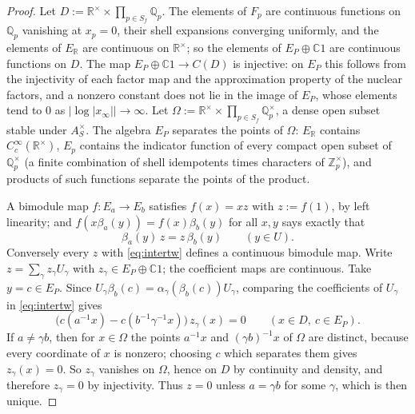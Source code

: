\documentclass[11pt]{amsart}
\theoremstyle{definition}
\theoremstyle{remark}
\newcommand{\C}{\mathbb C}
\newcommand{\R}{\mathbb R}
\newcommand{\Z}{\mathbb Z}
\newcommand{\Q}{\mathbb Q}
\begin{document}
\begin{proof}
Let $D:=\R^{\times}\times\prod_{p\in S_f}\Q_p$.  The elements of $F_p$ are
continuous functions on $\Q_p$ vanishing at $x_p=0$, their shell expansions
converging uniformly, and the elements of $E_{\R}$ are continuous on
$\R^{\times}$; so the elements of $E_P\oplus\C1$ are continuous functions on
$D$.  The map $E_P\oplus\C1\to C(D)$ is injective: on $E_P$ this follows from
the injectivity of each factor map and the approximation property of the
nuclear factors, and a nonzero constant does not lie in the image of $E_P$,
whose elements tend to $0$ as $|\log|x_{\infty}||\to\infty$.  Let
$\Omega:=\R^{\times}\times\prod_{p\in S_f}\Q_p^{\times}$, a dense open subset
stable under $A_S^{\times}$.  The algebra $E_P$ separates the points of
$\Omega$: $E_{\R}$ contains $C_c^{\infty}(\R^{\times})$, $E_p$ contains the
indicator function of every compact open subset of $\Q_p^{\times}$ (a finite
combination of shell idempotents times characters of $\Z_p^{\times}$), and
products of such functions separate the points of the product.

A bimodule map $f:E_a\to E_b$ satisfies $f(x)=xz$ with $z:=f(1)$, by left
linearity; and $f(x\beta_a(y))=f(x)\beta_b(y)$ for all $x,y$ says exactly
that
\begin{equation}\label{eq:intertw}
\beta_a(y)\,z=z\,\beta_b(y)\qquad(y\in U).
\end{equation}
Conversely every $z$ with \eqref{eq:intertw} defines a continuous bimodule
map.  Write $z=\sum_{\gamma}z_{\gamma}U_{\gamma}$ with $z_{\gamma}\in
E_P\oplus\C1$; the coefficient maps are continuous.  Take $y=c\in E_P$.  Since
$U_{\gamma}\beta_b(c)=\alpha_{\gamma}(\beta_b(c))U_{\gamma}$, comparing the
coefficients of $U_{\gamma}$ in \eqref{eq:intertw} gives
\[
\bigl(c(a^{-1}x)-c(b^{-1}\gamma^{-1}x)\bigr)\,z_{\gamma}(x)=0
\qquad(x\in D,\ c\in E_P).
\]
If $a\ne\gamma b$, then for $x\in\Omega$ the points $a^{-1}x$ and
$(\gamma b)^{-1}x$ of $\Omega$ are distinct, because every coordinate of $x$ is
nonzero; choosing $c$ which separates them gives $z_{\gamma}(x)=0$.  So
$z_{\gamma}$ vanishes on $\Omega$, hence on $D$ by continuity and density,
and therefore $z_{\gamma}=0$ by injectivity.
Thus $z=0$ unless $a=\gamma b$ for some $\gamma$, which is then unique.


\end{proof}
\end{document}
